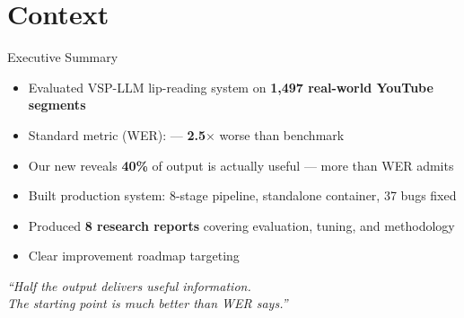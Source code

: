 
\section{Context}

\begin{frame}{Executive Summary}
  \begin{itemize}
    \item Evaluated VSP-LLM lip-reading system on \textbf{1,497 real-world YouTube segments}
    \item Standard metric (WER):  --- \textbf{2.5$\times$} worse than benchmark
    \item Our new  reveals \textbf{40\%} of output is actually useful ---
           more than WER admits
    \item Built production system: 8-stage pipeline, standalone container, 37 bugs fixed
    \item Produced \textbf{8 research reports} covering evaluation, tuning, and methodology
    \item Clear improvement roadmap targeting 
  \end{itemize}

  \vspace{6pt}
  \centering
  {\textcolor{ArgosTeal}{\textit{``Half the output delivers useful information.\\
  The starting point is much better than WER says.''}}}

\end{frame}

